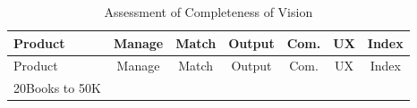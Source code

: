 \documentclass[11pt,openany]{book}
\begin{document}
\newpage

\begin{longtable}[]{@{}lcccccc@{}}
\caption{Assessment of Completeness of Vision}\tabularnewline
\toprule
\begin{minipage}[b]{0.29\columnwidth}\raggedright
Product\strut
\end{minipage} & \begin{minipage}[b]{0.09\columnwidth}\centering
Manage\strut
\end{minipage} & \begin{minipage}[b]{0.08\columnwidth}\centering
Match\strut
\end{minipage} & \begin{minipage}[b]{0.09\columnwidth}\centering
Output\strut
\end{minipage} & \begin{minipage}[b]{0.07\columnwidth}\centering
Com.\strut
\end{minipage} & \begin{minipage}[b]{0.10\columnwidth}\centering
UX\strut
\end{minipage} & \begin{minipage}[b]{0.10\columnwidth}\centering
Index\strut
\end{minipage}\tabularnewline
\midrule
\endfirsthead
\toprule
\begin{minipage}[b]{0.29\columnwidth}\raggedright
Product\strut
\end{minipage} & \begin{minipage}[b]{0.09\columnwidth}\centering
Manage\strut
\end{minipage} & \begin{minipage}[b]{0.08\columnwidth}\centering
Match\strut
\end{minipage} & \begin{minipage}[b]{0.09\columnwidth}\centering
Output\strut
\end{minipage} & \begin{minipage}[b]{0.07\columnwidth}\centering
Com.\strut
\end{minipage} & \begin{minipage}[b]{0.10\columnwidth}\centering
UX\strut
\end{minipage} & \begin{minipage}[b]{0.10\columnwidth}\centering
Index\strut
\end{minipage}\tabularnewline
\midrule
\endhead
\begin{minipage}[t]{0.29\columnwidth}\raggedright
20Books to 50K\strut
\end{minipage} & \begin{minipage}[t]{0.09\columnwidth}\centering

\end{minipage}
\end{longtable}
\end{document}
